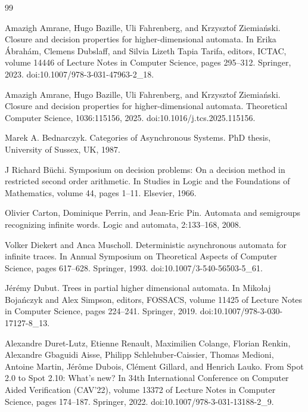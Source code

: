 \begin{thebibliography}{99}
\par\noindent    Amazigh Amrane, Hugo Bazille, Uli Fahrenberg, and Krzysztof Ziemiański.  Closure and decision properties for higher-dimensional automata.  In Erika Ábrahám, Clemens Dubslaff, and Silvia Lizeth Tapia Tarifa, editors, ICTAC, volume 14446 of Lecture Notes in Computer Science, pages 295–312. Springer, 2023.  doi:10.1007/978-3-031-47963-2\_18.  

\par\noindent    Amazigh Amrane, Hugo Bazille, Uli Fahrenberg, and Krzysztof Ziemiański.  Closure and decision properties for higher-dimensional automata.  Theoretical Computer Science, 1036:115156, 2025.  doi:10.1016/j.tcs.2025.115156.  

\par\noindent    Marek A. Bednarczyk.  Categories of Asynchronous Systems.  PhD thesis, University of Sussex, UK, 1987.  

\par\noindent    J Richard Büchi.  Symposium on decision problems: On a decision method in restricted second order arithmetic.  In Studies in Logic and the Foundations of Mathematics, volume 44, pages 1–11. Elsevier, 1966.  

\par\noindent    Olivier Carton, Dominique Perrin, and Jean-Eric Pin.  Automata and semigroups recognizing infinite words.  Logic and automata, 2:133–168, 2008.  

\par\noindent    Volker Diekert and Anca Muscholl.  Deterministic asynchronous automata for infinite traces.  In Annual Symposium on Theoretical Aspects of Computer Science, pages 617–628. Springer, 1993.  doi:10.1007/3-540-56503-5\_61.  

\par\noindent    Jérémy Dubut.  Trees in partial higher dimensional automata.  In Mikołaj Bojańczyk and Alex Simpson, editors, FOSSACS, volume 11425 of Lecture Notes in Computer Science, pages 224–241. Springer, 2019.  doi:10.1007/978-3-030-17127-8\_13.  

\par\noindent    Alexandre Duret-Lutz, Etienne Renault, Maximilien Colange, Florian Renkin, Alexandre Gbaguidi Aisse, Philipp Schlehuber-Caissier, Thomas Medioni, Antoine Martin, Jérôme Dubois, Clément Gillard, and Henrich Lauko.  From Spot 2.0 to Spot 2.10: What’s new?  In 34th International Conference on Computer Aided Verification (CAV’22), volume 13372 of Lecture Notes in Computer Science, pages 174–187. Springer, 2022.  doi:10.1007/978-3-031-13188-2\_9.  


\end{thebibliography}
